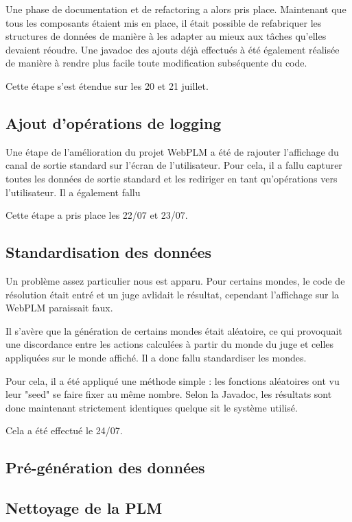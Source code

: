 \documentclass[stage]{tnreport}
\begin{document}
Une phase de documentation et de refactoring a alors pris place. Maintenant que tous les composants étaient mis en place, il était possible de refabriquer les structures de données de manière à les adapter au mieux aux tâches qu'elles devaient réoudre.
Une javadoc des ajouts déjà effectués à été également réalisée de manière à rendre plus facile toute modification subséquente du code.

Cette étape s'est étendue sur les 20 et 21 juillet.

\subsection{Ajout d'opérations de logging}

Une étape de l'amélioration du projet WebPLM a été de rajouter l'affichage du canal de sortie standard sur l'écran de l'utilisateur. Pour cela, il a fallu capturer toutes les données de sortie standard et les rediriger en tant qu'opérations vers l'utilisateur. Il a également fallu 

Cette étape a pris place les 22/07 et 23/07.

\subsection{Standardisation des données}

Un problème assez particulier nous est apparu. Pour certains mondes, le code de résolution était entré et un juge avlidait le résultat, cependant l'affichage sur la WebPLM paraissait faux.

Il  s'avère que la génération de certains mondes était aléatoire, ce qui provoquait une discordance entre les actions calculées à partir du monde du juge et celles appliquées sur le monde affiché. Il a donc fallu standardiser les mondes.

Pour cela, il a été appliqué une méthode simple : les fonctions aléatoires ont vu leur "seed" se faire fixer au même nombre. Selon la Javadoc, les résultats sont donc maintenant strictement identiques quelque sit le système utilisé.

Cela a été effectué le 24/07.

\subsection{Pré-génération des données}

\subsection{Nettoyage de la PLM}
\end{document}
